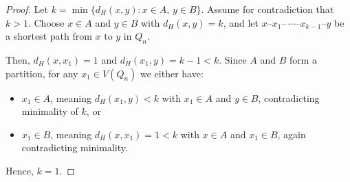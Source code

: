 \begin{proof}
    Let $k = \min\{d_H(x, y) : x \in A, \, y \in B\}$.
    Assume for contradiction that $k > 1$.
    Choose $x \in A$ and $y \in B$ with $d_H(x, y) = k$, and let $x$--$x_1$--$\,\cdots$--$x_{k-1}$--$y$ be a shortest path from $x$ to $y$ in $Q_n$.

    Then, $d_H(x, x_1) = 1$ and $d_H(x_1, y) = k - 1 < k$.
    Since $A$ and $B$ form a partition, for any $x_1 \in V(Q_n)$ we either have:
    \begin{itemize}
        \item $x_1 \in A$, meaning $d_H(x_1, y) < k$ with $x_1 \in A$ and $y \in B$, contradicting minimality of $k$, or
        \item $x_1 \in B$, meaning $d_H(x, x_1) = 1 < k$ with $x \in A$ and $x_1 \in B$, again contradicting minimality.
    \end{itemize}
    Hence, $k = 1$.
\end{proof}

\smallskip

